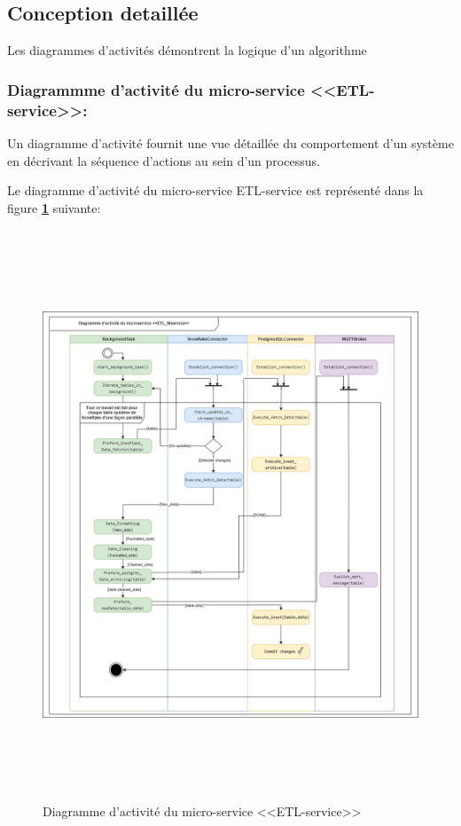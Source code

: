 \subsection{Conception detaillée}
\par Les diagrammes d'activités démontrent la logique d'un algorithme 
\subsubsection{Diagrammme d'activité du micro-service <<ETL-service>>:}
\par Un diagramme d'activité fournit une vue détaillée du comportement d'un système en décrivant la séquence d'actions au sein d'un processus\cite{diag_act}.
\par Le diagramme d'activité du micro-service ETL-service est représenté dans la figure \textbf{\ref{fig:act}} suivante:
    \begin{figure}[H]
        \centering
        \includegraphics[width =1\linewidth, height=17cm]{img/conception/diag_act_1.png}
        \caption{Diagramme d'activité du micro-service <<ETL-service>>}
        \label{fig:act}
        \end{figure}
